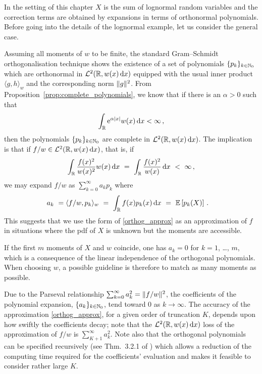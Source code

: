 In the setting of this chapter $X$ is the sum of lognormal random variables and the correction terms are obtained by expansions in terms of orthonormal polynomials.
Before going into the details of the lognormal example, let us consider the general case.

Assuming all moments of $w$ to be finite,
the standard Gram--Schmidt orthogonalisation technique shows the existence
of a set of polynomials $\{p_k\}_{k\in\mathbb{N}_0}$ which are orthonormal in
$\mathcal{L}^2(\mathbb{R}, w(x) \mathop{}\!\mathrm{d} x)$ equipped with the usual inner product
$\langle g, h \rangle_w$ and the corresponding norm
$\lVert g\rVert^2$.
From Proposition~\ref{prop:complete_polynomials}, we know that if there is an $\alpha>0$ such that
\begin{equation}\label{DefinedMGFCondition}
\int_{\mathbb{R}} \mathrm{e}^{\alpha|x|} w(x) \mathop{}\!\mathrm{d} x < \infty\,,
\end{equation}
then the polynomials $\{p_k\}_{k\in\mathbb{N}_0}$ are complete in $\mathcal{L}^2(\mathbb{R}, w(x) \mathop{}\!\mathrm{d} x)$. The implication is that if $f/w \in \mathcal{L}^2(\mathbb{R}, w(x) \mathop{}\!\mathrm{d} x)$, that is, if
\begin{equation}\label{L2Condition1}
\int_{\mathbb{R}} \frac{f(x)^2}{w(x)^2} w(x) \mathop{}\!\mathrm{d} x\ =\ \int_{\mathbb{R}} \frac{f(x)^2}{w(x)} \mathop{}\!\mathrm{d} x\ <\ \infty\,,
\end{equation}
we may expand $f/w$ as $\sum_{k=0}^\infty a_k p_k$ where
\begin{align}\label{28.10a}a_k\ &=
\langle f/w, p_k \rangle_w\ =\ \int_{\RL} f(x) p_k(x) \dd x\ =\ \Exp\left[p_k(X)\right]\,.
\end{align}
This suggests that we use the form of \eqref{orthog_approx} as an approximation of $f$ in situations where the pdf of $X$ is unknown but the moments are accessible.

\begin{remark}\label{Rem:27.10a}
If the first $m$ moments of $X$ and $w$ coincide, one has $a_k=0$ for $k=1$, \ldots, $m$, which is a consequence of the linear independence of the orthogonal polynomials.
When choosing $w$, a possible guideline is therefore to match as many moments as possible.
\remQED
\end{remark}

Due to the Parseval relationship $\sum_{k=0}^\infty a_k^2=\lVert f/w\rVert^2$, the coefficients of the polynomial expansion, $\{a_k\}_{k\in\mathbb{N}_0}$, tend toward $0$ as $k \to \infty$.
The accuracy of the approximation \eqref{orthog_approx}, for a given order of truncation $K$, depends upon how swiftly the coefficients decay; note that the $\mathcal{L}^2(\mathbb{R}, w(x) \mathop{}\!\mathrm{d} x)$ loss of the approximation of $f/w$ is $\sum_{K+1}^{\infty}a_k^2$.
Note also that the orthogonal polynomials can be specified recursively
(see Thm.~3.2.1 of \cite{Szegoe1939}) which allows a reduction of the computing time required for the coefficients' evaluation
and makes it feasible to consider rather large $K$.

